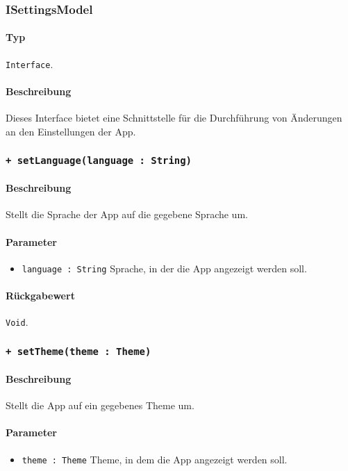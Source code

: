 \subsubsection{ISettingsModel}\label{App_Settings_ISettingsModel}
\paragraph*{Typ}
\texttt{Interface}.
\paragraph*{Beschreibung}
Dieses Interface bietet eine Schnittstelle für die Durchführung von Änderungen an den Einstellungen der App.

\subsubsection*{\texttt{+ setLanguage(language : String)}}\label{App_Settings_ISettingsModel_setLanguage}%
\paragraph*{Beschreibung}
Stellt die Sprache der App auf die gegebene Sprache um.
\paragraph*{Parameter}
\begin{itemize}
    \item \texttt{language : String} Sprache, in der die App angezeigt werden soll.
\end{itemize}
\paragraph*{Rückgabewert}
\texttt{Void}.

\subsubsection*{\texttt{+ setTheme(theme : Theme)}}\label{App_Settings_ISettingsModel_setTheme}%
\paragraph*{Beschreibung}
Stellt die App auf ein gegebenes Theme um.
\paragraph*{Parameter}
\begin{itemize}
    \item \texttt{theme : Theme} Theme, in dem die App angezeigt werden soll.
\end{itemize}
